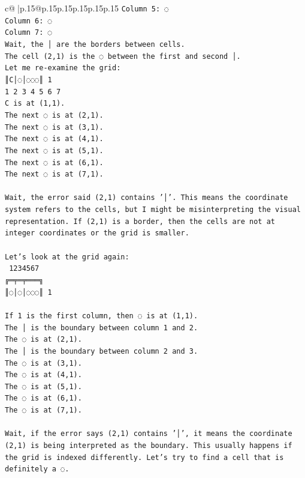 \documentclass{article}
\begin{document}
{\begin{supertabular}{c@{$\;$}|p{.15\linewidth}@{}p{.15\linewidth}p{.15\linewidth}p{.15\linewidth}p{.15\linewidth}p{.15\linewidth}}
{{{\texttt{Column 5: ◌} \\
\texttt{Column 6: ◌} \\
\texttt{Column 7: ◌} \\
\texttt{Wait, the │ are the borders between cells.} \\
\texttt{The cell (2,1) is the ◌ between the first and second │.} \\
\texttt{Let me re{-}examine the grid:} \\
\texttt{║C│◌│◌◌◌║ 1} \\
\texttt{1 2 3 4 5 6 7} \\
\texttt{C is at (1,1).} \\
\texttt{The next ◌ is at (2,1).} \\
\texttt{The next ◌ is at (3,1).} \\
\texttt{The next ◌ is at (4,1).} \\
\texttt{The next ◌ is at (5,1).} \\
\texttt{The next ◌ is at (6,1).} \\
\texttt{The next ◌ is at (7,1).} \\
\\ 
\texttt{Wait, the error said (2,1) contains '│'. This means the coordinate system refers to the cells, but I might be misinterpreting the visual representation. If (2,1) is a border, then the cells are not at integer coordinates or the grid is smaller.} \\
\\ 
\texttt{Let's look at the grid again:} \\
\texttt{ 1234567} \\
\texttt{╔═╤═╤═══╗} \\
\texttt{║◌│◌│◌◌◌║ 1} \\
\\ 
\texttt{If 1 is the first column, then ◌ is at (1,1).} \\
\texttt{The │ is the boundary between column 1 and 2.} \\
\texttt{The ◌ is at (2,1).} \\
\texttt{The │ is the boundary between column 2 and 3.} \\
\texttt{The ◌ is at (3,1).} \\
\texttt{The ◌ is at (4,1).} \\
\texttt{The ◌ is at (5,1).} \\
\texttt{The ◌ is at (6,1).} \\
\texttt{The ◌ is at (7,1).} \\
\\ 
\texttt{Wait, if the error says (2,1) contains '│', it means the coordinate (2,1) is being interpreted as the boundary. This usually happens if the grid is indexed differently. Let's try to find a cell that is definitely a ◌.} \\
}}}
\end{supertabular}}
\end{document}
